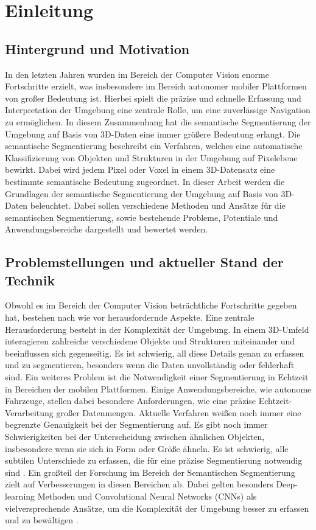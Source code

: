 \chapter{Einleitung}

\section{Hintergrund und Motivation}

In den letzten Jahren wurden im Bereich der Computer Vision enorme Fortschritte
erzielt, was insbesondere im Bereich autonomer mobiler Plattformen von großer
Bedeutung ist. Hierbei spielt die präzise und schnelle Erfassung und
Interpretation der Umgebung eine zentrale Rolle, um eine zuverlässige
Navigation zu ermöglichen. In diesem Zusammenhang hat die semantische
Segmentierung der Umgebung auf Basis von 3D-Daten eine immer größere Bedeutung
erlangt. Die semantische Segmentierung beschreibt ein Verfahren, welches eine
automatische Klassifizierung von Objekten und Strukturen in der Umgebung auf
Pixelebene bewirkt. Dabei wird jedem Pixel oder Voxel in einem 3D-Datensatz
eine bestimmte semantische Bedeutung zugeordnet. In dieser Arbeit werden die
Grundlagen der semantische Segmentierung der Umgebung auf Basis von 3D-Daten
beleuchtet. Dabei sollen verschiedene Methoden und Ansätze für die semantischen
Segmentierung, sowie bestehende Probleme, Potentiale und Anwendungsbereiche
dargestellt und bewertet werden.\cite{9102769}

\section{Problemstellungen und aktueller Stand der Technik}

Obwohl es im Bereich der Computer Vision beträchtliche Fortschritte gegeben
hat, bestehen nach wie vor herausfordernde Aspekte. Eine zentrale
Herausforderung besteht in der Komplexität der Umgebung. In einem 3D-Umfeld
interagieren zahlreiche verschiedene Objekte und Strukturen miteinander und
beeinflussen sich gegenseitig. Es ist schwierig, all diese Details genau zu
erfassen und zu segmentieren, besonders wenn die Daten unvollständig oder
fehlerhaft sind. Ein weiteres Problem ist die Notwendigkeit einer Segmentierung
in Echtzeit in Bereichen der mobilen Plattformen. Einige Anwendungsbereiche,
wie autonome Fahrzeuge, stellen dabei besondere Anforderungen, wie eine präzise
Echtzeit-Verarbeitung großer Datenmengen. Aktuelle Verfahren weißen noch immer
eine begrenzte Genauigkeit bei der Segmentierung auf. Es gibt noch immer
Schwierigkeiten bei der Unterscheidung zwischen ähnlichen Objekten,
insbesondere wenn sie sich in Form oder Größe ähneln. Es ist schwierig, alle
subtilen Unterschiede zu erfassen, die für eine präzise Segmentierung notwendig
sind \cite{9420573}. Ein großteil der Forschung im Bereich der Semantischen
Segmentierung zielt auf Verbesserungen in diesen Bereichen ab. Dabei gelten
besonders Deep-learning Methoden und Convolutional Neural Networks (CNNs) als
vielversprechende Ansätze, um die Komplexität der Umgebung besser zu erfassen
und zu bewältigen \cite{9423307,8100085}.